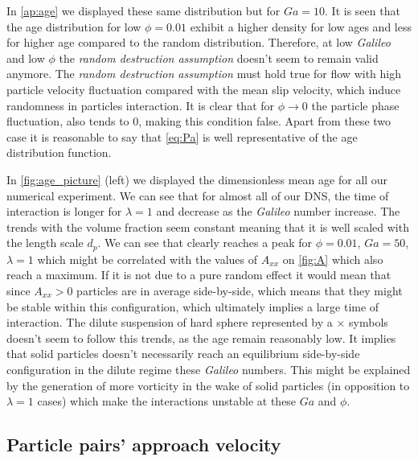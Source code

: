 In \ref{ap:age}  we displayed these same distribution but for $Ga = 10$. 
It is seen that the age distribution for low $\phi = 0.01$ exhibit a higher density for low ages and less for higher age compared to the random distribution.
Therefore, at low \textit{Galileo} and low $\phi$ the \textit{random destruction assumption} doesn't seem to remain valid anymore. 
The \textit{random destruction assumption}  must hold true for flow with high particle velocity fluctuation compared with the mean slip velocity, which induce randomness in particles interaction\citep{zhang2023evolution}.
It is clear that for $\phi \rightarrow 0$ the particle phase fluctuation, also tends to $0$, making this condition false. 
Apart from these two case it is reasonable to say that \ref{eq:Pa} is well representative of the age distribution function. 

In \ref{fig:age_picture} (left) we displayed the dimensionless mean age for all our numerical experiment. 
We can see that for almost all of our DNS, the time of interaction is longer for $\lambda = 1$ and decrease as the \textit{Galileo} number increase. 
The trends with the volume fraction seem constant meaning that it is well scaled with the length scale $d_p$. 
We can see that clearly reaches a peak for $\phi=0.01$, $Ga=50$, $\lambda=1$ which might be correlated with the values of $A_{xx}$ on \ref{fig:A} which also reach a maximum. 
If it is not due to a pure random effect it would mean that since $A_{xx} >0$ particles are in average side-by-side, which means that they might be stable within this configuration, which ultimately implies a large time of interaction.  
The dilute suspension of hard sphere represented by a $\pmb\times$ symbols doesn't seem to follow this trends, as the age remain reasonably low. 
It implies that solid particles doesn't necessarily reach an equilibrium side-by-side configuration in the dilute regime these \textit{Galileo} numbers. 
This might be explained by the generation of more vorticity in the wake of solid particles (in opposition to $\lambda = 1$ cases) which make the interactions unstable at these $Ga$ and $\phi$. 

\subsection{Particle pairs' approach velocity}

